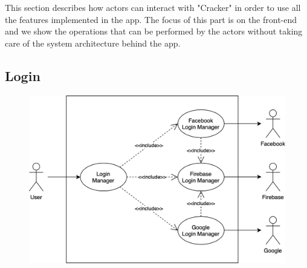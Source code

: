 This section describes how actors can interact with "Cracker" in order to use all the features implemented in the app. The focus of this part is on the front-end and we show the operations that can be performed by the actors without taking care of the system architecture behind the app.

\vspace{6mm}

\subsection{Login}
\begin{figure}[h]
\centering
\includegraphics[width=\textwidth]{img/usecases/login}
\end{figure}

\clearpage

